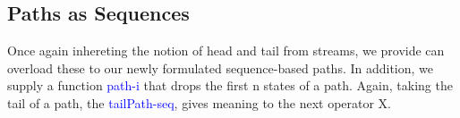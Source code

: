 \documentclass[a4paper, 11pt]{article}
\newcommand{\blue}[1]{\textcolor{blue}{#1}}
\newcommand{\green}[1]{\textcolor{hooker\'sgreen}{#1}}
\begin{document}
\subsection{Paths as Sequences}

Once again inhereting the notion of head and tail from streams, we provide can
overload these to our newly formulated sequence-based paths. In addition, we
supply a function \blue{path-i} that drops the first n states of a path. Again,
taking the tail of a path, the \blue{tailPath-seq}, gives meaning to the next
operator \green{X}.

\begin{code}[hide]%
%
\>[2]\AgdaSpace{}%
\AgdaSymbol{:}\AgdaSpace{}%
\AgdaSpace{}%
\AgdaSpace{}%
\<%
\\
%
\>[2]\AgdaSpace{}%
\AgdaSpace{}%
\AgdaSymbol{=}\AgdaSpace{}%
\AgdaSpace{}%
\AgdaSpace{}%
\<%
\\
%
\\[\AgdaEmptyExtraSkip]%
%
\>[2]\AgdaSpace{}%
\AgdaSymbol{:}\AgdaSpace{}%
\AgdaSpace{}%
\AgdaSpace{}%
\<%
\\
%
\>[2]\AgdaSpace{}%
\AgdaSpace{}%
%
\>[34]\AgdaSpace{}%
\AgdaSymbol{=}\AgdaSpace{}%
\AgdaSpace{}%
\AgdaSpace{}%
\AgdaSymbol{(}\AgdaSpace{}%
\AgdaSymbol{)}\<%
\\
%
\>[2]\AgdaSpace{}%
\AgdaSpace{}%
%
\>[34]\AgdaSpace{}%
\AgdaSymbol{=}\AgdaSpace{}%
\AgdaSpace{}%
\AgdaSpace{}%
\AgdaSymbol{(}\AgdaSpace{}%
\AgdaSymbol{)}\<%
\\
%
\\[\AgdaEmptyExtraSkip]%
%
\>[2]\AgdaSpace{}%
\AgdaSymbol{:}\AgdaSpace{}%
\AgdaSpace{}%
\AgdaSpace{}%
\AgdaSpace{}%
\AgdaSpace{}%
\<%
\\
%
\>[2]\AgdaSpace{}%
%
\>[17]\AgdaSpace{}%
\AgdaSymbol{=}\AgdaSpace{}%
\<%
\\
%
\>[2]\AgdaSpace{}%
\AgdaSymbol{(}\AgdaSpace{}%
\AgdaSymbol{)}\AgdaSpace{}%
\AgdaSpace{}%
\AgdaSymbol{=}\AgdaSpace{}%
\AgdaSpace{}%
\AgdaSpace{}%
\AgdaSymbol{(}\AgdaSpace{}%
\AgdaSymbol{)}\<%
\end{code}
\end{document}

